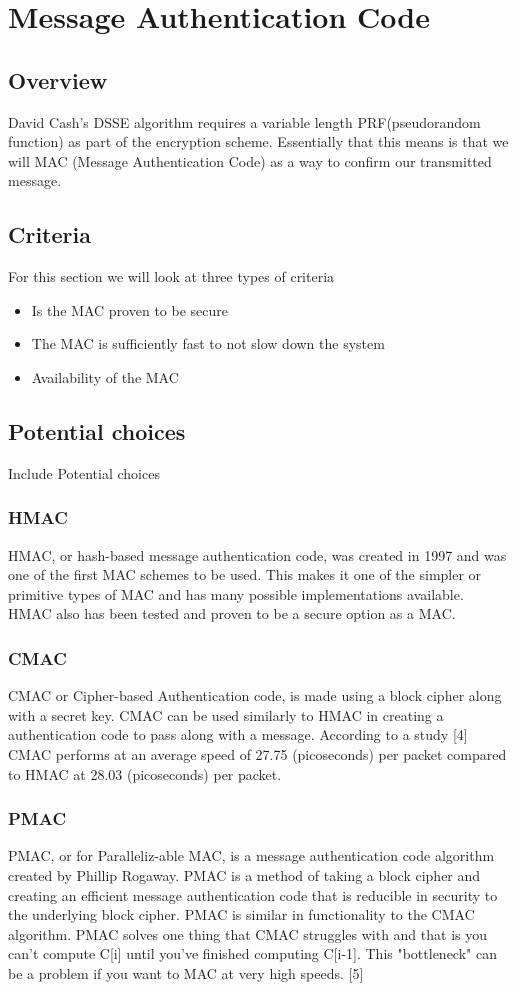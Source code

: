 \section{ Message Authentication Code }
\subsection{ Overview }
David Cash's DSSE algorithm requires a variable length PRF(pseudorandom function) as part of the encryption scheme. Essentially that this means is that we will MAC (Message Authentication Code) as a way to confirm our transmitted message. 
\subsection{ Criteria }
For this section we will look at three types of criteria\
\begin{itemize}
\item Is the MAC proven to be secure
\item The MAC is sufficiently fast to not slow down the system
\item Availability of the MAC
\end{itemize}
\subsection{ Potential choices }
Include Potential choices
\subsubsection{ HMAC } 
HMAC, or hash-based message authentication code, was created in 1997 and was one of the first MAC schemes to be used. This makes it one of the simpler or primitive types of MAC and has many possible implementations available. HMAC  also has been tested and proven to be a secure option as a MAC. 
\subsubsection{ CMAC }
CMAC or Cipher-based Authentication code, is made using a block cipher along with a secret key. CMAC can be used similarly to HMAC in creating a authentication code to pass along with a message. According to a study [4]
CMAC performs at an average speed of 27.75 (picoseconds) per packet compared to HMAC at 28.03 (picoseconds) per packet. 

\subsubsection{ PMAC }
PMAC, or for Paralleliz-able MAC, is a message authentication code algorithm created by Phillip Rogaway. PMAC is a method of taking a block cipher and creating an efficient message authentication code that is reducible in security to the underlying block cipher. PMAC is similar in functionality to the CMAC algorithm. PMAC solves one thing that CMAC struggles with and that is you can't compute C[i] until you've finished computing C[i-1]. This "bottleneck" can be a problem if you want to MAC at very high speeds. [5]
    
